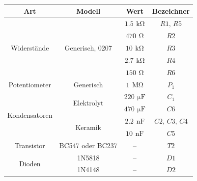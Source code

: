 \documentclass[a4paper, 12pt]{article}
\begin{document}
    \begin{table}[H]
    \begin{center}
      \begin{tabular}{@{}cccc@{}}
        \toprule
        Art                            & Modell                           & Wert                        & Bezeichner          \\ \midrule
        \multirow{5}{*}{Widerstände}   & \multirow{5}{*}{Generisch, 0207} & $1.5 \,\ \si{\kilo\ohm}$    & $R1$, $R5$        \\
                                       &                                  & $470 \,\ \si{\ohm}$         & $R2$               \\
                                       &                                  & $10 \,\ \si{\kilo\ohm}$     & $R3$               \\
                                       &                                  & $2.7 \,\ \si{\kilo\ohm}$    & $R4$               \\
                                       &                                  & $150 \,\ \si{\ohm}$         & $R6$               \\ \midrule
        Potentiometer                  & Generisch                        & $1 \,\ \si{\mega\ohm}$      & $P_1$               \\ \midrule
        \multirow{4}{*}{Kondensatoren} & \multirow{2}{*}{Elektrolyt}      & $220 \,\ \si{\micro\farad}$ & $C_1$               \\
                                       &                                  & $470 \,\ \si{\micro\farad}$ & $C6$               \\
                                       & \multirow{2}{*}{Keramik}         & $2.2 \,\ \si{\nano\farad}$  & $C2$, $C3$, $C4$ \\
                                       &                                  & $10 \,\ \si{\nano\farad}$   & $C5$               \\ \midrule
        Transistor                     & BC547 oder BC237                 & –                           & $T2$               \\ \midrule
        \multirow{2}{*}{Dioden}        & 1N5818                           & –                           & $D1$               \\
                                       & 1N4148                           & –                           & $D2$               \\ \midrule

\end{tabular}
\end{center}
\end{table}
\end{document}
